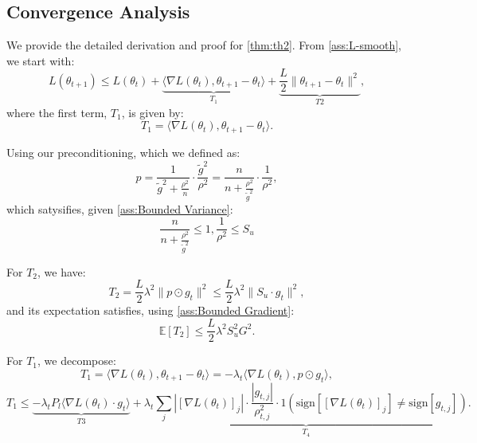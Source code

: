 \documentclass{article}
\theoremstyle{plain}
\theoremstyle{definition}
\theoremstyle{remark}
\begin{document}
\subsection{Convergence Analysis}
We provide the detailed derivation and proof for \cref{thm:th2}.
\noindent
From \cref{ass:L-smooth}, we start with:
\begin{equation}
    L(\theta_{t+1}) \leq L(\theta_t) + \underbrace{\langle \nabla L(\theta_t), \theta_{t+1} - \theta_t \rangle}_{T_1} + \underbrace{\frac{L}{2} \|\theta_{t+1} - \theta_t\|^2}_{T2},
\end{equation}
where the first term, $T_1$, is given by:
\begin{equation}
    T_1 = \langle \nabla L(\theta_t), \theta_{t+1} - \theta_t \rangle.
\end{equation}

\noindent
Using our preconditioning, which we defined as:
\begin{equation}
    p = \frac{1}{\widetilde{g}^2 + \frac{\rho^2}{n}} \cdot \frac{ \widetilde{g }^2}{\rho^2}= \frac{n}{n + \frac{\rho^2}{\widetilde{g}^2}} \cdot \frac{1}{\rho^2},
\end{equation}
which satysifies, given  \cref{ass:Bounded Variance}:
\begin{equation}
    \frac{n}{n + \frac{\rho^2}{\widetilde{g}^2}} \leq 1, \frac{1}{\rho^2}  \leq S_u
\end{equation}


\noindent
For $T_2$, we have:
\begin{equation}
    T_2 = \frac{L}{2} \lambda^2 \|p \odot g_t\|^2 \leq \frac{L}{2} \lambda^2 \|S_u  \cdot g_t\|^2,
\end{equation}
and its expectation satisfies, using  \cref{ass:Bounded Gradient}:
\begin{equation}
    \mathbb{E}[T_2] \leq \frac{L}{2} \lambda^2 S_u^2 G^2.
\end{equation}

\noindent
For $T_1$, we decompose:
\begin{equation}
    T_1 = \langle \nabla L(\theta_t), \theta_{t+1} - \theta_t \rangle = -\lambda_t \langle \nabla L(\theta_t), p \odot g_t \rangle,
\end{equation}
\begin{equation}
    T_1 \leq \underbrace{-\lambda_t P_l \langle\nabla L(\theta_t) \cdot g_{t}\rangle}_{T3}+\underbrace{\lambda_t\sum_j|[\nabla L(\theta_{t})]_j| \cdot \frac{|g_{t,j}|}{\rho_{t,j}^2} \cdot  1(\text{sign}[[\nabla L(\theta_t)]_j] \neq \text{sign}[g_{t,j}])}_{T_4}.
\end{equation}
\end{document}
